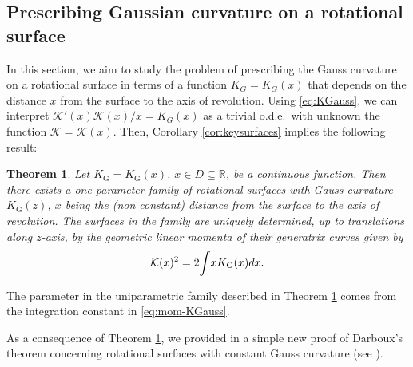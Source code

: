 \documentclass[leqno,11pt]{amsart}
\def\R{\mathbb{R}}
\newtheorem{theorem}{Theorem}[section]
\theoremstyle{definition}
\numberwithin{equation}{section}
\begin{document}



\subsection{Prescribing Gaussian curvature on a rotational surface}\label{SectKGprescribed}

In this section, we aim to study the problem of prescribing the Gauss curvature on a rotational surface in terms of a function $K_G=K_G(x)$ that depends on the distance $x$ from the surface to the axis of revolution. Using \eqref{eq:KGauss}, we can interpret $\mathcal K'(x)\mathcal K(x)/x=K_G(x)$ as a trivial o.d.e.\ with unknown the function $\mathcal K=\mathcal K(x)$. Then, Corollary \ref{cor:keysurfaces} implies the following result:

\begin{theorem}\cite[Theorem 4.(b)]{CC22}
	\label{th:Prescribe_KGauss}
 Let $K_{\text{G}}=K_{\text{G}}(x)$, $x\in D \subseteq \R $, be a continuous function. 
		Then there exists a one-parameter family of rotational surfaces with Gauss curvature  $K_{\text{G}}(z)$,
		$x$ being the (non constant) distance from the surface to the axis of revolution. The surfaces in the family are uniquely determined, up to translations along $z$-axis, by the geometric linear momenta of their generatrix curves given by
		\begin{equation}\label{eq:mom-KGauss}
			\mathcal K(x)^2 =2 \! \int \! x  K_{\text G}(x) dx.
		\end{equation}
\end{theorem}
The parameter in the uniparametric family described in Theorem \ref{th:Prescribe_KGauss} comes from the integration constant in \eqref{eq:mom-KGauss}.

As a consequence of Theorem \ref{th:Prescribe_KGauss}, we provided in \cite{CC22} a simple new proof of Darboux's theorem concerning rotational surfaces with constant Gauss curvature (see \cite[Corollary 5]{CC22}).

\end{document}
